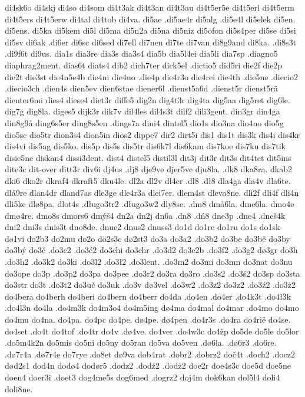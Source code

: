 di4sk6o
di4skj
di4so
di4som
di4t3ak
di4t3an
di4t3au
di4t5er5e
di4t5erl
di4t5erm
di4t5ers
di4t5erw
di4tal
di4tob
di4va.
di5ae
.di5ae4r
di5alg
.di5e4l
di5elek
di5en.
di5ens.
di5ka
di5kem
di5l
di5ma
di5n2a
di5na
di5niz
di5ofon
di5s4per
di5se
di5si
di5sv
di6ak
.di6er
di6sc
di6sed
di7ell
di7nen
di7te
di7van
di8g9and
di8ka.
.di8s3t
.di9f6t
di9us.
dia1s
dia3re
dia3s
dia3s4
dia5b
dia5l4ei
dia5li
dia7sp
.diagno5
diaphrag2ment.
dias6t
diats4
dib2
dich7ter
dick5el
.dictio5
did5ri
die2f
die2p
die2t
die3st
die4n5e4b
die4ni
die4no
.die4p
die4r3o
die4rei
die4th
.die5ne
.diecio2
.diecio3ch
.dien4s
dien5ev
dien6stae
diener6l
.dienst5a6d
.dienst5r
dienst5rä
dienter6mi
dies4
diese4
diet3r
diffe5
dig2n
dig4t3r
dig4ta
dig5aa
dig5ret
dig6le.
dig7g
dig8la.
diges5
dijk3r
dik7v
dil4les
dil4s3t
dilf2
dili3gent.
din3gr
din4ga
din8g9å
ding6s5er
ding8s5en
.dings7a
dini4
dintel5
dio1s
dio3na
dio4no
dio5g
dio5sc
dio5tr
dion3s4
dion5in
dios2
dippe7
dir2
dirt5i
dis1
dis1t
dis3k
dis4i
dis4kr
dis4vi
dis5ag
dis5ko.
dis5p
dis5s
dis5tr
dis6k7l
dis6kam
dis7koe
dis7ku
dis7tik
disie5ne
diskan4
dissi3dent.
dist4
distel5
distil3l
dit3j
dit3r
dit3s
dit4tet
dit5ins
dite3c
dit-over
ditt3r
div6i
dj4us
.dj8
dje9ve
djer5ve
dju8la.
.dk8
dka8ra.
dkab2
dki6
dko2r
dkraf4
dkraft5
dku4le.
dl2a
dl2v
dl4er
.dl8
.dł8
dla4ga
dla4v
dla6te.
dlå9re
dlan4dr
dland7as
dle3ge
dle4r3a
dlei7er.
dlem4st
dleva8ne.
dli2f
dli4f
dli4n
dli5ke
dlø8pa.
dlot4s
.długo3tr2
.długo3w2
dly8se.
.dm8
dmå6la.
dme6la.
dmo4e
dmø4re.
dmo8s
dmors6
dmýš4
dn2a
dn2j
dn6a
.dn8
.dń8
dne3p
.dne4
.dneš4k
dni2
dni3s
dnis3t
dno8de.
dnue2
dnus2
dnuss3
do1d
do1re
do1ru
do1s
do1sk
dø1vi
do2b3
do2mu
do2o
dö2s3c
dø2st3
do3a
do3a2
.do3b2
do3be
do3bě
do3by
do3bý
do3č
.do3c2
.do3ć2
do3chi
do3chr
.do3d2
do3e2b
.do3f2
.do3g2
dø3gr
do3h
.do3h2
.do3k2
do3ki
.do3l2
.do3ł2
.do3lent.
.do3m2
do3mi
do3mn
do3nat
do3nu
do3ope
do3p
.do3p2
do3pa
do3pee
.do3r2
do3ra
do3ro
.do3s2
.do3ś2
do3sp
do3sta
do3str
do3t
.do3t2
do3uč
do3uk
.do3v
dø3vel
.do3w2
.do3z2
do3z2
.do3ź2
.do3ż2
do4bera
do4berh
do4beri
do4bern
do4berr
do4da
.do4en
.do4er
.do4k3t
.do4ł3k
.do4l3n
do4la
.do4m3k
do4m3o4
do4m5ing
dø4ma
do4mal
do4mar
.do4mo
do4mo
do4mu
do4na.
do4pa.
do4pc
do4pe.
dø4pe.
dø4pen
.do4r3s
.do4ra
do4rië
do4se.
do4set
.do4t
do4tof
.do4tr
do4v
.dø4ve.
do4ver
.do4w3c
do4žp
do5de
do5le
do5lor
.do5m4k2n
do5mis
do5ni
do5ny
do5ran
do5va
do5ven
.dø6la.
.dø6r3
.do6re.
.dø7r4a
.dø7r4e
do7rye
.do8et
dø9va
dob4rat
.dobr2
.dobrz2
doč4t
.doch2
.docz2
død2s1
dod4n
dodø4
dodør5
.dodz2
.dodź2
.dodż2
doe2r
doe4s3c
doe5d
doe5ne
doen4
doer3i
.doet3
dog4me5s
dog6med
.dogrz2
doj4m
dok6kan
dol5l4
doli4
doli8ne.

